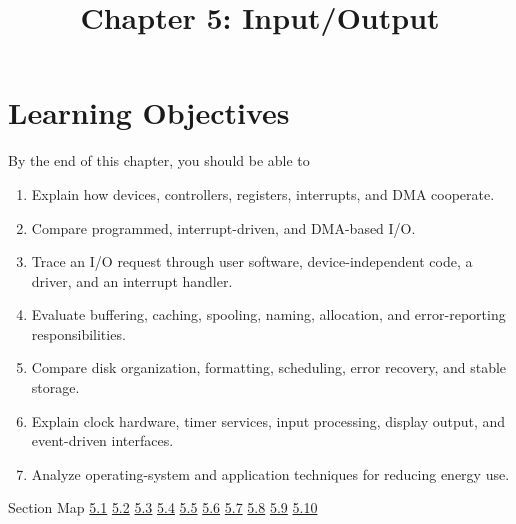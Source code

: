 \documentclass[10pt,letterpaper]{article}
\title{Chapter 5: Input/Output}
\author{}
\date{}
\begin{document}
\maketitle
\section*{Learning Objectives}
\begin{studybox}{By the end of this chapter, you should be able to}
\begin{enumerate}
  \item Explain how devices, controllers, registers, interrupts, and DMA cooperate.
  \item Compare programmed, interrupt-driven, and DMA-based I/O.
  \item Trace an I/O request through user software, device-independent code, a driver, and an interrupt handler.
  \item Evaluate buffering, caching, spooling, naming, allocation, and error-reporting responsibilities.
  \item Compare disk organization, formatting, scheduling, error recovery, and stable storage.
  \item Explain clock hardware, timer services, input processing, display output, and event-driven interfaces.
  \item Analyze operating-system and application techniques for reducing energy use.
\end{enumerate}
\end{studybox}

\begin{studybox}{Section Map}
\hyperlink{sec-5-1}{5.1} \quad \hyperlink{sec-5-2}{5.2} \quad \hyperlink{sec-5-3}{5.3} \quad \hyperlink{sec-5-4}{5.4} \quad \hyperlink{sec-5-5}{5.5} \quad \hyperlink{sec-5-6}{5.6} \quad \hyperlink{sec-5-7}{5.7} \quad \hyperlink{sec-5-8}{5.8} \quad \hyperlink{sec-5-9}{5.9} \quad \hyperlink{sec-5-10}{5.10}
\end{studybox}
\end{document}
